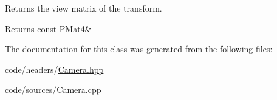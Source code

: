 Returns the view matrix of the transform. 

\begin{DoxyReturn}{Returns}
const P\+Mat4\& 
\end{DoxyReturn}


The documentation for this class was generated from the following files\+:\begin{DoxyCompactItemize}
\item 
code/headers/\mbox{\hyperlink{_camera_8hpp}{Camera.\+hpp}}\item 
code/sources/Camera.\+cpp\end{DoxyCompactItemize}
